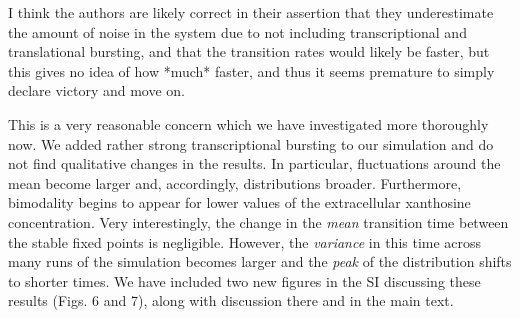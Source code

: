 \documentclass[11pt,letterpaper]{article}
\begin{document}
\begin{review}
I think the authors are likely correct in their assertion that they
underestimate the amount of noise in the system due to not including
transcriptional and translational bursting, and that the transition
rates would likely be faster, but this gives no idea of how *much*
faster, and thus it seems premature to simply declare victory and move
on.
\end{review}

\begin{response}
This is a very reasonable concern which we have investigated more
thoroughly now. We added rather strong transcriptional bursting to our
simulation and do not find qualitative changes in the results. In
particular, fluctuations around the mean become larger and, accordingly,
distributions broader. Furthermore, bimodality begins to appear for
lower values of the extracellular xanthosine concentration. Very
interestingly, the change in the \emph{mean} transition time between the
stable fixed points is negligible. However, the \emph{variance} in this
time across many runs of the simulation becomes larger and the
\emph{peak} of the distribution shifts to shorter times. We have
included two new figures in the SI discussing these results (Figs. 6 and
7), along with discussion there and in the main text.
\end{response}

%
\end{document}

